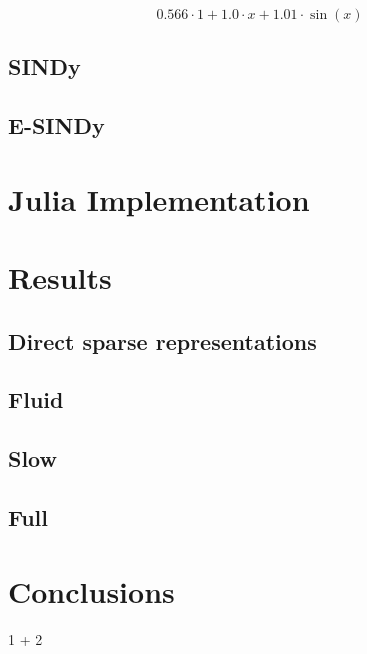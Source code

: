 \documentclass[
]{article}
\newenvironment{Shaded}{\begin{snugshade}}{\end{snugshade}}
\newcommand{\FloatTok}[1]{\textcolor[rgb]{0.68,0.00,0.00}{#1}}
\newcommand{\OperatorTok}[1]{\textcolor[rgb]{0.37,0.37,0.37}{#1}}
\begin{document}
\begin{equation} 0.566 \cdot 1 + 1.0 \cdot x + 1.01 \cdot \sin\left( x \right) \end{equation}

\subsection{SINDy}\label{sindy}

\subsection{E-SINDy}\label{e-sindy}

\section{Julia Implementation}\label{julia-implementation}

\section{Results}\label{results}

\subsection{Direct sparse
representations}\label{direct-sparse-representations}

\subsection{Fluid}\label{fluid}

\subsection{Slow}\label{slow}

\subsection{Full}\label{full}

\section{Conclusions}\label{conclusions}

\begin{Shaded}
\begin{Highlighting}[]
\FloatTok{1} \OperatorTok{+} \FloatTok{2}
\end{Highlighting}
\end{Shaded}
\end{document}
